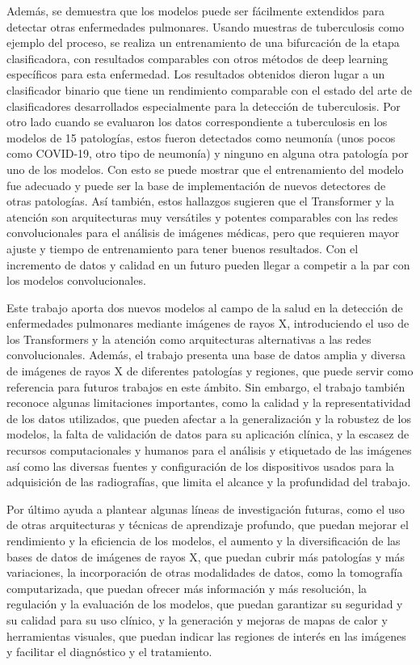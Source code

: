 Además, se demuestra que los modelos puede ser fácilmente extendidos para detectar otras enfermedades
pulmonares. Usando muestras de tuberculosis como ejemplo del proceso, se realiza un entrenamiento
de una bifurcación de la etapa clasificadora, con resultados comparables con otros métodos de deep learning
específicos para esta enfermedad. Los resultados obtenidos dieron lugar a un clasificador binario que tiene un
rendimiento comparable con el estado del arte de clasificadores desarrollados especialmente para la
detección de tuberculosis. Por otro lado cuando se evaluaron los datos correspondiente a tuberculosis
en los modelos de 15 patologías, estos fueron detectados como neumonía (unos pocos como COVID-19, otro
tipo de neumonía) y ninguno en alguna otra patología por uno de los modelos. Con esto se puede mostrar
que el entrenamiento del modelo fue adecuado y puede ser la base de implementación de nuevos detectores
de otras patologías. Así también, estos hallazgos sugieren que el Transformer y la atención son
arquitecturas muy versátiles y potentes comparables con las redes convolucionales para el análisis
de imágenes médicas, pero que requieren mayor ajuste y tiempo de entrenamiento para tener buenos
resultados. Con el incremento de datos y calidad en un futuro pueden llegar a competir a la par con
los modelos convolucionales.

Este trabajo aporta dos nuevos modelos al campo de la salud en la detección de enfermedades
pulmonares mediante imágenes de rayos X, introduciendo el uso de los Transformers y la atención como
arquitecturas alternativas a las redes convolucionales. Además, el trabajo presenta una base de
datos amplia y diversa de imágenes de rayos X de diferentes patologías y regiones, que puede servir
como referencia para futuros trabajos en este ámbito. Sin embargo, el trabajo también reconoce algunas
limitaciones importantes, como la calidad y la representatividad de los datos utilizados, que pueden
afectar a la generalización y la robustez de los modelos, la falta de validación de datos para
su aplicación clínica, y la escasez de recursos computacionales y humanos para el análisis y etiquetado
de las imágenes así como las diversas fuentes y configuración de los dispositivos usados para la
adquisición de las radiografías, que limita el alcance y la profundidad del trabajo.

Por último ayuda a plantear algunas líneas de investigación futuras, como el uso de otras arquitecturas y
técnicas de aprendizaje profundo, que puedan mejorar el rendimiento y la eficiencia de los modelos,
el aumento y la diversificación de las bases de datos de imágenes de rayos X, que puedan cubrir más
patologías y más variaciones, la incorporación de otras modalidades de datos, como la tomografía
computarizada, que puedan ofrecer más información y más resolución, la regulación y la evaluación de
los modelos, que puedan garantizar su seguridad y su calidad para su uso clínico, y la generación y
mejoras de mapas de calor y herramientas visuales, que puedan indicar las regiones de interés en las
imágenes y facilitar el diagnóstico y el tratamiento.
